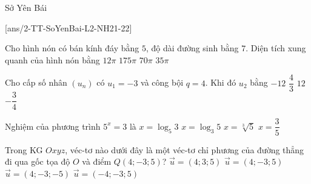 \begin{name}
	{\tenchude}
	{\tendethi}
	{Sở Yên Bái}
	{\thoigian}
\end{name}
[ans/2-TT-SoYenBai-L2-NH21-22]


\begin{ex}%
Cho hình nón có bán kính đáy bằng $5$, độ dài đường sinh bằng $7$. Diện tích xung quanh của hình nón bằng
\choice
{$12\pi$}
{$175\pi$}
{$70\pi$}
{\True $35\pi$}
\end{ex}

\begin{ex}%
Cho cấp số nhân $(u_n)$ có $u_1=-3$ và công bội $q=4$. Khi đó $u_2$ bằng
\choice
{\True $-12$}
{$\dfrac{4}{3}$}
{$12$}
{$-\dfrac{3}{4}$}
\end{ex}



\begin{ex}%
Nghiệm của phương trình $5^x=3$ là
\choice
{\True $x=\log_5 3$}
{$x=\log_3 5$}
{$x=\sqrt[3]{5}$}
{$x=\dfrac{3}{5}$}
\end{ex}



\begin{ex}%
Trong KG $Oxyz$, véc-tơ nào dưới đây là một véc-tơ chỉ phương của đường thẳng đi qua gốc tọa độ $O$ và điểm $Q(4;-3;5)$?
\choice
{$\overrightarrow{u}=(4;3;5)$}
{\True $\overrightarrow{u}=(4;-3;5)$}
{$\overrightarrow{u}=(4;-3;-5)$}
{$\overrightarrow{u}=(-4;-3;5)$}
\end{ex}



